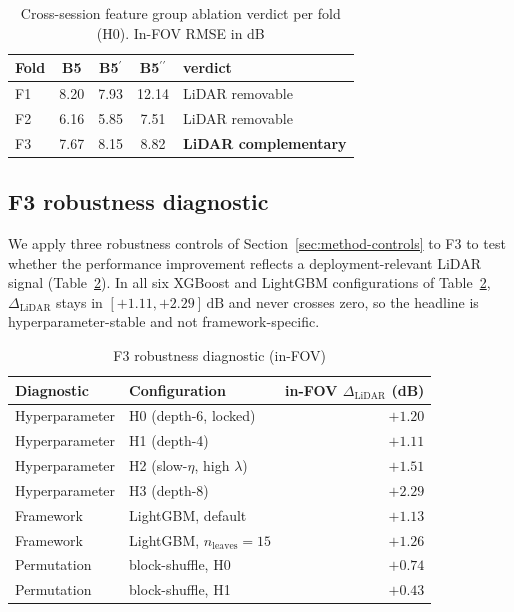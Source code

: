 \documentclass[conference]{IEEEtran}
\newcommand{\dlidar}{\ensuremath{\Delta_{\mathrm{LiDAR}}}}
\newcommand{\dB}{\,\mathrm{dB}}
\begin{document}
\begin{table}[!htbp]
    \caption{Cross-session feature group ablation verdict per fold (H0). In-FOV RMSE in dB}
    \label{tab:cs-disambig}
    \centering
    \footnotesize
    \begin{tabular}{l c c c l}
        \toprule
        Fold & B5 & B5$^\prime$ & B5$^{\prime\prime}$ & verdict \\
        \midrule
        F1 & 8.20 & 7.93 & 12.14 & LiDAR removable \\
        F2 & 6.16 & 5.85 & 7.51 & LiDAR removable \\
        F3 & 7.67 & 8.15 & 8.82 & \textbf{LiDAR complementary} \\
        \bottomrule
    \end{tabular}
    \vspace{-10pt}
\end{table}


\subsection{F3 robustness diagnostic}
\label{sec:f3-diag}
We apply three robustness controls of Section~\ref{sec:method-controls} to F3 to test whether the performance improvement reflects a deployment-relevant LiDAR signal (Table~\ref{tab:f3-diag}).
In all six XGBoost and LightGBM configurations of Table~\ref{tab:f3-diag}, $\dlidar$ stays in $[+1.11, +2.29]\dB$ and never crosses zero, so the headline is hyperparameter-stable and not framework-specific.

\vspace{-8pt}
\begin{table}[!htbp]
    \caption{F3 robustness diagnostic (in-FOV)}
    \label{tab:f3-diag}
    \centering
    \setlength{\tabcolsep}{4pt}
    \footnotesize
    \begin{tabular}{l l r}
        \toprule
        Diagnostic & Configuration & in-FOV $\dlidar$ (dB) \\
        \midrule
        Hyperparameter & H0 (depth-6, locked)        & $+1.20$ \\
        Hyperparameter & H1 (depth-4)                & $+1.11$ \\
        Hyperparameter & H2 (slow-$\eta$, high $\lambda$) & $+1.51$ \\
        Hyperparameter & H3 (depth-8)                & $+2.29$ \\
        Framework      & LightGBM, default           & $+1.13$ \\
        Framework      & LightGBM, $n_{\text{leaves}}{=}15$ & $+1.26$ \\
        Permutation    & block-shuffle, H0           & $+0.74$ \\
        Permutation    & block-shuffle, H1           & $+0.43$ \\
        \bottomrule
    \end{tabular}
\end{table}
\end{document}
